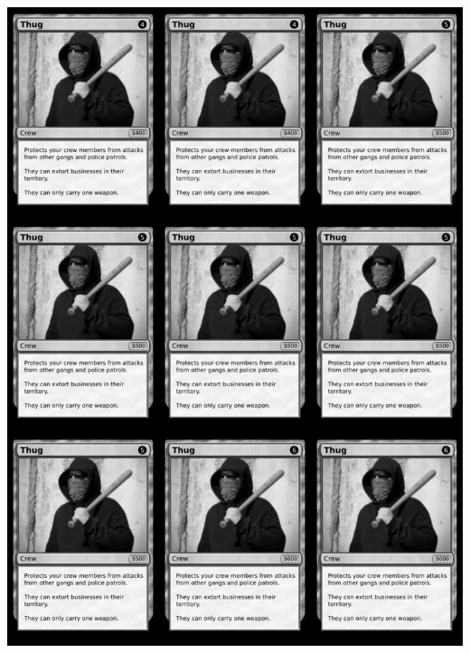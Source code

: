 \documentclass[a4paper]{article}
\begin{document}
\begin{center}
	\centering
	\includegraphics[width=190.5mm,height=266.7mm]{output/temp/page18.png}
\end{center}

\newpage
\end{document}
